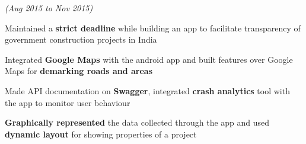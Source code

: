 \documentclass[a4paper]{deedy-resume} %
\begin{document}
\hfill {\textit{\small(Aug 2015 to Nov 2015)}}\


\begin{tightitemize}
\item Maintained a  \textbf{strict deadline} while building an app to facilitate transparency of government construction projects in India
\item Integrated \textbf{Google Maps} with the android app and built features over Google Maps for \textbf{demarking roads and areas}
\item Made API documentation on \textbf{Swagger}, integrated \textbf{crash analytics} tool with the app to monitor user behaviour
\item \textbf{Graphically represented} the data collected through the app and used \textbf{dynamic layout} for showing properties of a project
\end{tightitemize}
\microspace







\end{document}
